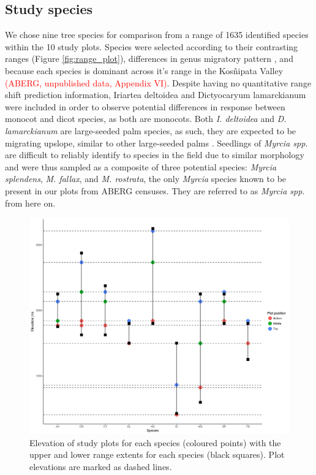 \documentclass[a4paper,11pt]{article}
\newcommand{\todo}[1]{\textcolor{red}{#1}}   %
\begin{document}
\subsection{Study species} 
We chose nine tree species for comparison from a range of 1635 identified species within the 10 study plots. Species were selected according to their contrasting ranges (Figure \ref{fig:range_plot}), differences in genus migratory pattern \citep{Feeley2011}, and because each species is dominant across it's range in the Kos\~{n}ipata Valley \todo{(ABERG, unpublished data, Appendix VI)}. Despite having no quantitative range shift prediction information, Iriartea deltoidea and Dictyocaryum lamarckianum were included in order to observe potential differences in response between monocot and dicot species, as both are monocots. Both \textit{I. deltoidea} and \textit{D. lamarckianum} are large-seeded palm species, as such, they are expected to be migrating upslope, similar to other large-seeded palms \citep{Hillyer2010}. Seedlings of \textit{Myrcia spp.} are difficult to reliably identify to species in the field due to similar morphology and were thus sampled as a composite of three potential species: \textit{Myrcia splendens}, \textit{M. fallax}, and \textit{M. rostrata}, the only \textit{Myrcia} species known to be present in our plots from ABERG censuses. They are referred to as \textit{Myrcia spp.} from here on. 

\begin{figure}[H]
\includegraphics[width=\textwidth]{ranges_ggplot}
\centering
\caption{Elevation of study plots for each species (coloured points) with the upper and lower range extents for each species (black squares). Plot elevations are marked as dashed lines.}
\label{fig:ranges_ggplot}
\end{figure}
\end{document}
